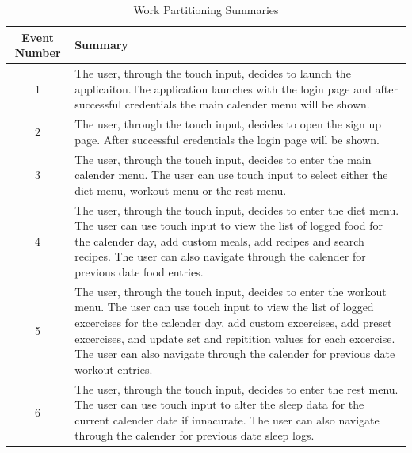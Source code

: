 \documentclass[12pt,letterpaper]{article}
\begin{document}
\begin{table}[h]
\caption{Work Partitioning Summaries}
    \centering
    \begin{tabular}{|c|p{10cm}|}
    \hline
    \textbf{Event Number} & \textbf{Summary} \\
    \hline
    1 & The user, through the touch input, decides to launch the applicaiton.The application launches with the login page and after successful credentials the main calender menu will be shown. \\
    \hline
    2 & The user, through the touch input, decides to open the sign up page. After successful credentials the login page will be shown. \\
    \hline
    3 & The user, through the touch input, decides to enter the main calender menu. The user can use touch input to select either the diet menu, workout menu or the rest menu. \\
    \hline
    4 & The user, through the touch input, decides to enter the diet menu. The user can use touch input to view the list of logged food for the calender day, add custom meals, add recipes and search recipes. The user can also navigate through the calender for previous date food entries. \\
    \hline
    5 & The user, through the touch input, decides to enter the workout menu. The user can use touch input to view the list of logged excercises for the calender day, add custom excercises, add preset excercises, and update set and repitition values for each excercise. The user can also navigate through the calender for previous date workout entries. \\
    \hline
    6 & The user, through the touch input, decides to enter the rest menu. The user can use touch input to alter the sleep data for the current calender date if innacurate. The user can also navigate through the calender for previous date sleep logs. \\
    \hline
    \end{tabular}
\end{table}
\end{document}
